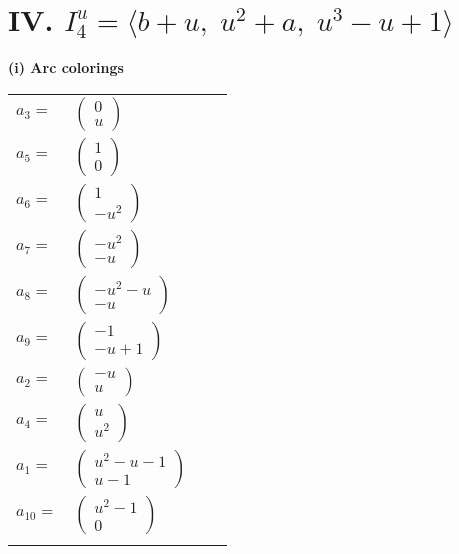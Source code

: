 \documentclass[1p]{elsarticle_modified}
\theoremstyle{definition}
\begin{document}
\centering \section*{IV. $I^u_{4}= \langle b+u,\;u^2+a,\;u^3- u+1 \rangle$}
\flushleft \textbf{(i) Arc colorings}\\
\begin{tabular}{m{7pt} m{180pt} m{7pt} m{180pt} }
\flushright $a_{3}=$&$\begin{pmatrix}0\\u\end{pmatrix}$ \\
\flushright $a_{5}=$&$\begin{pmatrix}1\\0\end{pmatrix}$ \\
\flushright $a_{6}=$&$\begin{pmatrix}1\\- u^2\end{pmatrix}$ \\
\flushright $a_{7}=$&$\begin{pmatrix}- u^2\\- u\end{pmatrix}$ \\
\flushright $a_{8}=$&$\begin{pmatrix}- u^2- u\\- u\end{pmatrix}$ \\
\flushright $a_{9}=$&$\begin{pmatrix}-1\\- u+1\end{pmatrix}$ \\
\flushright $a_{2}=$&$\begin{pmatrix}- u\\u\end{pmatrix}$ \\
\flushright $a_{4}=$&$\begin{pmatrix}u\\u^2\end{pmatrix}$ \\
\flushright $a_{1}=$&$\begin{pmatrix}u^2- u-1\\u-1\end{pmatrix}$ \\
\flushright $a_{10}=$&$\begin{pmatrix}u^2-1\\0\end{pmatrix}$\\&\end{tabular}
\end{document}
